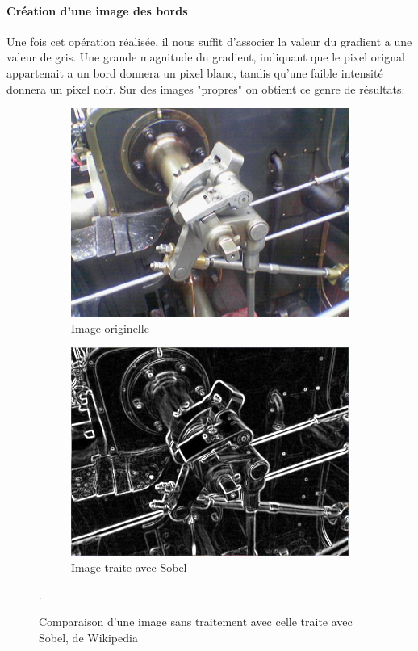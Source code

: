 \documentclass[a4paper, 12pt, titlepage, oneside, french]{article}
\begin{document}
	\paragraph{\textbf{Création d'une image des bords}}
	Une fois cet opération réalisée, il nous suffit d'associer la valeur du gradient a une valeur de gris. Une grande magnitude du gradient, indiquant que le pixel orignal appartenait a un bord donnera un pixel blanc, tandis qu'une faible intensité donnera un pixel noir.
	Sur des images "propres" on obtient ce genre de résultats:
	\begin{figure}[H]
		\centering
		\begin{subfigure}[]{0.4\linewidth}
			\includegraphics[width=\linewidth]{ValveOriginal.png}
			\caption{Image originelle}
		\end{subfigure}
		\begin{subfigure}[]{0.4\linewidth}
			\includegraphics[width=\linewidth]{ValveSobel.png}
			\caption{Image traite avec Sobel}
		\end{subfigure}
		\caption{Comparaison d'une image sans traitement avec celle traite avec Sobel, de Wikipedia \cite{WikiCannyOriginal}\cite{WikiSobel}}. 
		\label{fig:SobelGood}
	\end{figure}
\end{document}
